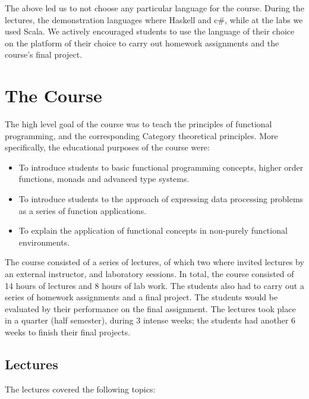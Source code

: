 \documentclass[conference]{IEEEtran}
\begin{document}
The above led us to not choose any particular language for the course.  During
the lectures, the demonstration languages where Haskell and {\sc c\#}, while at
the labs we used Scala. We actively encouraged students to use the language of
their choice on the platform of their choice to carry out homework assignments
and the course's final project.

\section{The Course}

The high level goal of the course was to teach the principles of functional
programming, and the corresponding Category theoretical principles. 
More specifically, the educational purposes of the course were:

\begin{itemize}

  \item To introduce students to basic functional programming concepts,
    higher order functions, monads and advanced type systems.

  \item To introduce students to the approach of expressing data processing
    problems as a series of function applications.

  \item To explain the application of functional concepts in non-purely
    functional environments.

\end{itemize}

The course consisted of a series of lectures, of which two where invited
lectures by an external instructor, and laboratory sessions. In total, the
course consisted of 14 hours of lectures and 8 hours of lab work.
The students
also had to carry out a series of homework assignments and a final project.
The students would be evaluated by their performance on the final assignment. 
The lectures took place in a quarter (half semester), during 3 intense 
weeks; the students had another 6 weeks to finish their final projects.

\subsection{Lectures}

The lectures covered the following topics:
\end{document}
